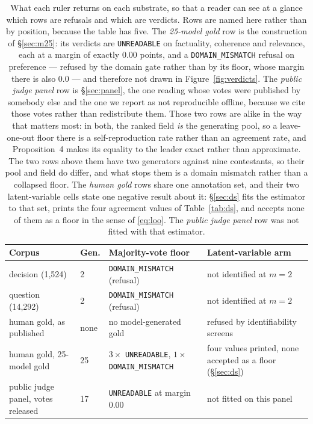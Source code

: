 \documentclass{article}
\begin{document}
\begin{table}[htbp]
\centering\footnotesize\setlength{\tabcolsep}{4pt}
\begin{tabular}{@{}p{2.5cm}p{1.0cm}p{3.4cm}p{3.5cm}@{}}\toprule
Corpus & Gen. & Majority-vote floor & Latent-variable arm \\ \midrule
decision (1,524) & 2 & \texttt{DOMAIN\_MISMATCH} (refusal) & not identified at $m=2$ \\
question (14,292) & 2 & \texttt{DOMAIN\_MISMATCH} (refusal) & not identified at $m=2$ \\
human gold, as published & none & no model-generated gold & refused by identifiability screens \\
human gold, 25-model gold & 25 & $3\times$ \texttt{UNREADABLE}, $1\times$ \texttt{DOMAIN\_MISMATCH} & four values printed, none accepted as a floor (\S\ref{sec:ds}) \\
public judge panel, votes released & 17 & \texttt{UNREADABLE} at margin $0.00$ & not fitted on this panel \\ \bottomrule
\end{tabular}
\caption{What each ruler returns on each substrate, so that a reader can see at a glance which rows are
refusals and which are verdicts. Rows are named here rather than by position, because the table has five.
The \emph{25-model gold} row is the construction of \S\ref{sec:m25}: its verdicts are \texttt{UNREADABLE} on
factuality, coherence and relevance, each at a margin of exactly $0.00$ points, and a
\texttt{DOMAIN\_MISMATCH} refusal on preference --- refused by the domain gate rather than by its floor, whose
margin there is also $0.0$ --- and therefore not drawn in Figure~\ref{fig:verdicts}. The \emph{public judge panel} row is \S\ref{sec:panel}, the one reading whose votes were
published by somebody else and the one we report as not reproducible offline, because we cite those votes
rather than redistribute them. Those two rows are alike in the way that matters most: in both, the ranked field
\emph{is} the generating pool, so a leave-one-out floor there is a self-reproduction rate rather than an
agreement rate, and Proposition~4 makes its equality to the leader exact rather than approximate. The two rows
above them have two generators against nine contestants, so their pool and field do differ, and what stops them
is a domain mismatch rather than a collapsed floor. The \emph{human gold} rows share one annotation set, and their
two latent-variable cells state one negative result about it: \S\ref{sec:ds} fits the estimator to that set, prints
the four agreement values of Table~\ref{tab:ds}, and accepts none of them as a floor in the sense of
\eqref{eq:loo}. The \emph{public judge panel} row was not fitted with that estimator.}
\label{tab:outcomes}
\end{table}
\end{document}
